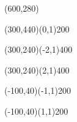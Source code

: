 \documentclass[12pt]{article}
\begin{document}
\begin{figure}[htb]
\hspace*{\fill}
\begin{egame}(600,280)

\renewcommand{\egarrowstyle}{e}

\putbranch(300,440)(0,1){200}



\renewcommand{\egarrowstyle}{e}

\putbranch(300,240)(-2,1){400}

\renewcommand{\egarrowstyle}{e}

\putbranch(300,240)(2,1){400}

\renewcommand{\egarrowstyle}{}

\putbranch(-100,40)(-1,1){200}

\renewcommand{\egarrowstyle}{e}

\putbranch(-100,40)(1,1){200}

\renewcommand{\egarrowstyle}{}


\end{egame}
\end{figure}
\end{document}
